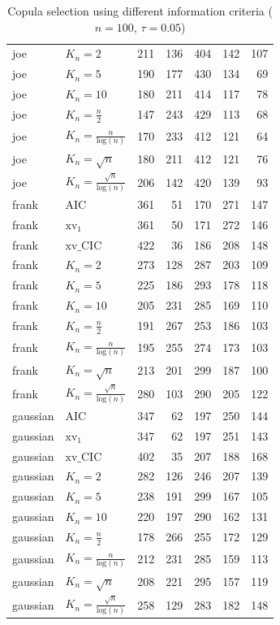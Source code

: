 \begin{table}[htbp]
\begin{tabular}{llrrrrr}
  joe & $K_{n}=2$ & 211 & 136 & 404 & 142 & 107 \\ 
  joe & $K_{n}=5$ & 190 & 177 & 430 & 134 & 69 \\ 
  joe & $K_{n}=10$ & 180 & 211 & 414 & 117 & 78 \\ 
  joe & $K_{n}=\tfrac{n}{2}$ & 147 & 243 & 429 & 113 & 68 \\ 
  joe & $K_{n}=\tfrac{n}{\text{log}(n)}$ & 170 & 233 & 412 & 121 & 64 \\ 
  joe & $K_{n}=\sqrt{n}$ & 180 & 211 & 412 & 121 & 76 \\ 
  joe & $K_{n}=\tfrac{\sqrt{n}}{\text{log}(n)}$ & 206 & 142 & 420 & 139 & 93 \\ 
   \hdashline
frank & AIC & 361 & 51 & 170 & 271 & 147 \\ 
  frank & $\text{xv}_{1}$ & 361 & 50 & 171 & 272 & 146 \\ 
  frank & $\text{xv}\_\text{CIC}$ & 422 & 36 & 186 & 208 & 148 \\ 
  frank & $K_{n}=2$ & 273 & 128 & 287 & 203 & 109 \\ 
  frank & $K_{n}=5$ & 225 & 186 & 293 & 178 & 118 \\ 
  frank & $K_{n}=10$ & 205 & 231 & 285 & 169 & 110 \\ 
  frank & $K_{n}=\tfrac{n}{2}$ & 191 & 267 & 253 & 186 & 103 \\ 
  frank & $K_{n}=\tfrac{n}{\text{log}(n)}$ & 195 & 255 & 274 & 173 & 103 \\ 
  frank & $K_{n}=\sqrt{n}$ & 213 & 201 & 299 & 187 & 100 \\ 
  frank & $K_{n}=\tfrac{\sqrt{n}}{\text{log}(n)}$ & 280 & 103 & 290 & 205 & 122 \\ 
   \hdashline
gaussian & AIC & 347 & 62 & 197 & 250 & 144 \\ 
  gaussian & $\text{xv}_{1}$ & 347 & 62 & 197 & 251 & 143 \\ 
  gaussian & $\text{xv}\_\text{CIC}$ & 402 & 35 & 207 & 188 & 168 \\ 
  gaussian & $K_{n}=2$ & 282 & 126 & 246 & 207 & 139 \\ 
  gaussian & $K_{n}=5$ & 238 & 191 & 299 & 167 & 105 \\ 
  gaussian & $K_{n}=10$ & 220 & 197 & 290 & 162 & 131 \\ 
  gaussian & $K_{n}=\tfrac{n}{2}$ & 178 & 266 & 255 & 172 & 129 \\ 
  gaussian & $K_{n}=\tfrac{n}{\text{log}(n)}$ & 212 & 231 & 285 & 159 & 113 \\ 
  gaussian & $K_{n}=\sqrt{n}$ & 208 & 221 & 295 & 157 & 119 \\ 
  gaussian & $K_{n}=\tfrac{\sqrt{n}}{\text{log}(n)}$ & 258 & 129 & 283 & 182 & 148 \\ 
   \hline
\end{tabular}
\caption{Copula selection using different information criteria ($n = 100$, $\tau = 0.05$)} 
\end{table}


